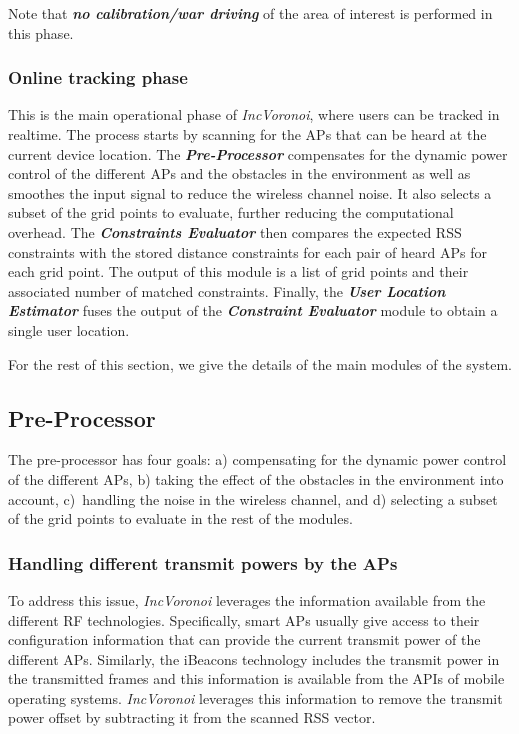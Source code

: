 \documentclass[conference]{IEEEtran}
\def \sys {\textit{IncVoronoi}}
\begin{document}
Note that \textbf{\emph{no calibration/war driving}} of the area of interest is performed in this phase. 
\subsubsection{Online tracking phase}
This is the main operational phase of \sys{}, where users can be tracked in realtime. The process starts by scanning for the APs that can be heard at the current device location. The \textbf{\emph{Pre-Processor}} compensates for the dynamic power control of the different APs and the obstacles in the environment as well as smoothes the input signal to reduce the wireless channel noise. It also selects a subset of the grid points to evaluate, further reducing the computational overhead. The \textbf{\emph{Constraints Evaluator}} then compares the expected RSS constraints with the stored distance constraints for each pair of heard APs for each grid point. The output of this module is a list of grid points and their associated number of matched constraints. Finally, the \emph{\textbf{User Location Estimator}} fuses the output of the \textbf{\emph{Constraint Evaluator}} module to obtain a single user location. 

For the rest of this section, we give the details of the main modules of the system.

\subsection{Pre-Processor}
The pre-processor has four goals: a) compensating for the dynamic power control of the different APs, b) taking the effect of the obstacles in the environment into account, c)~handling the noise in the wireless channel, and d) selecting a subset of the grid points to evaluate in the rest of the modules.

\subsubsection{Handling different transmit powers by the APs}
 To address this issue, \sys{} leverages the information available from the different RF technologies. Specifically, smart APs usually give access to their configuration information that can provide the current transmit power of the different APs. Similarly, the iBeacons technology includes the transmit power in the transmitted frames and this information is available from the APIs of mobile operating systems. \sys{} leverages this information to remove the transmit power offset by subtracting it from the scanned RSS vector.
\end{document}
